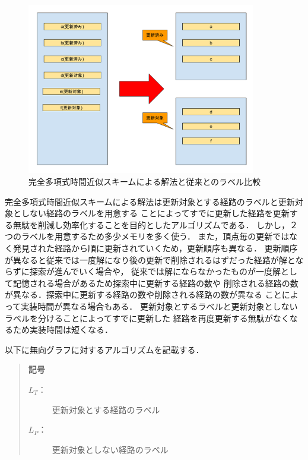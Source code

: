 \documentclass[12pt]{optlab-bachelor}
\begin{document}
\begin{figure}[htbp]
  \centering
  \caption{完全多項式時間近似スキームによる解法と従来とのラベル比較}
  \includegraphics[width=10.0cm]{fig/fig1.pdf}
\end{figure}

完全多項式時間近似スキームによる解法は更新対象とする経路のラベルと更新対象としない経路のラベルを用意する
ことによってすでに更新した経路を更新する無駄を削減し効率化することを目的としたアルゴリズムである．
しかし，２つのラベルを用意するため多少メモリを多く使う．
また，頂点毎の更新ではなく発見された経路から順に更新されていくため，更新順序も異なる．
更新順序が異なると従来では一度解になり後の更新で削除されるはずだった経路が解とならずに探索が進んでいく場合や，
従来では解にならなかったものが一度解として記憶される場合があるため探索中に更新する経路の数や
削除される経路の数が異なる．探索中に更新する経路の数や削除される経路の数が異なる
ことによって実装時間が異なる場合もある．
更新対象とするラベルと更新対象としないラベルを分けることによってすでに更新した
経路を再度更新する無駄がなくなるため実装時間は短くなる．


以下に無向グラフに対するアルゴリズムを記載する．

\begin{quote}
  \textbf{記号}
  \begin{description}
    \item[$L_T$：] 更新対象とする経路のラベル
    \item[$L_P$：] 更新対象としない経路のラベル
  \end{description}
\end{quote}
\end{document}
